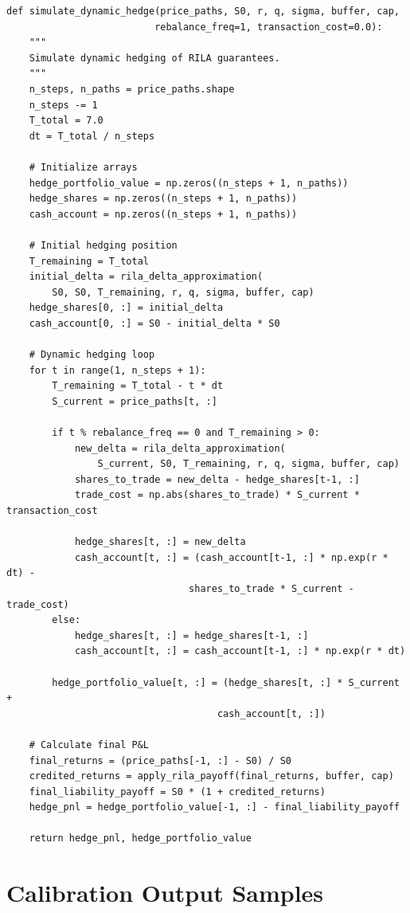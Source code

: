 \documentclass[12pt,a4paper]{report}
\begin{document}
\begin{verbatim}
def simulate_dynamic_hedge(price_paths, S0, r, q, sigma, buffer, cap, 
                          rebalance_freq=1, transaction_cost=0.0):
    """
    Simulate dynamic hedging of RILA guarantees.
    """
    n_steps, n_paths = price_paths.shape
    n_steps -= 1
    T_total = 7.0
    dt = T_total / n_steps
    
    # Initialize arrays
    hedge_portfolio_value = np.zeros((n_steps + 1, n_paths))
    hedge_shares = np.zeros((n_steps + 1, n_paths))
    cash_account = np.zeros((n_steps + 1, n_paths))
    
    # Initial hedging position
    T_remaining = T_total
    initial_delta = rila_delta_approximation(
        S0, S0, T_remaining, r, q, sigma, buffer, cap)
    hedge_shares[0, :] = initial_delta
    cash_account[0, :] = S0 - initial_delta * S0
    
    # Dynamic hedging loop
    for t in range(1, n_steps + 1):
        T_remaining = T_total - t * dt
        S_current = price_paths[t, :]
        
        if t % rebalance_freq == 0 and T_remaining > 0:
            new_delta = rila_delta_approximation(
                S_current, S0, T_remaining, r, q, sigma, buffer, cap)
            shares_to_trade = new_delta - hedge_shares[t-1, :]
            trade_cost = np.abs(shares_to_trade) * S_current * transaction_cost
            
            hedge_shares[t, :] = new_delta
            cash_account[t, :] = (cash_account[t-1, :] * np.exp(r * dt) - 
                                shares_to_trade * S_current - trade_cost)
        else:
            hedge_shares[t, :] = hedge_shares[t-1, :]
            cash_account[t, :] = cash_account[t-1, :] * np.exp(r * dt)
        
        hedge_portfolio_value[t, :] = (hedge_shares[t, :] * S_current + 
                                     cash_account[t, :])
    
    # Calculate final P&L
    final_returns = (price_paths[-1, :] - S0) / S0
    credited_returns = apply_rila_payoff(final_returns, buffer, cap)
    final_liability_payoff = S0 * (1 + credited_returns)
    hedge_pnl = hedge_portfolio_value[-1, :] - final_liability_payoff
    
    return hedge_pnl, hedge_portfolio_value
\end{verbatim}

\chapter{Calibration Output Samples}
\end{document}
